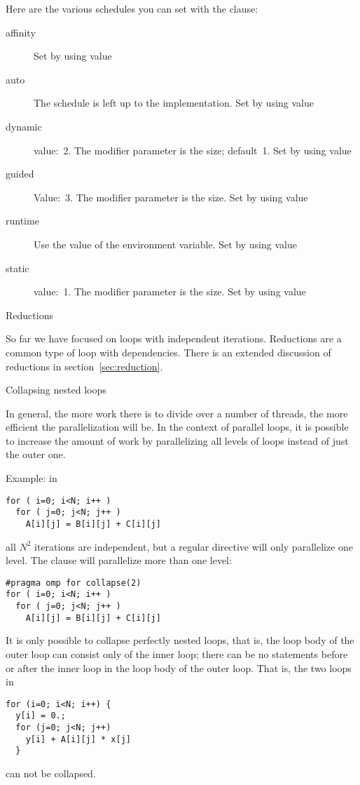 Here are the various schedules you can set with the
 clause:
\begin{description}
  \item[affinity] Set by using value  
  \item[auto] The schedule is left up to the implementation. Set by
    using value 
  \item[dynamic] value:~2. The modifier parameter is the
     size; default~1. Set by using value
  \item[guided] Value:~3. The modifier parameter is the
     size. Set by using value
  \item[runtime] Use the value of the 
    environment variable. Set by using value
  \item[static] value:~1. The modifier parameter is the  size. Set by using value  
\end{description}

 {Reductions}

So far we have focused on loops with independent iterations.
Reductions are a common type of loop with dependencies.
There is an extended discussion of reductions in section~\ref{sec:reduction}.

 {Collapsing nested loops}

In general, the more work there is to divide over a number of threads,
the more efficient the parallelization will be. In the context of
parallel loops, it is possible to increase the amount of work by
parallelizing all levels of loops instead of just the outer one.

Example: in
\begin{verbatim}
for ( i=0; i<N; i++ )
  for ( j=0; j<N; j++ )
    A[i][j] = B[i][j] + C[i][j] 
\end{verbatim}
all $N^2$ iterations are independent, but a regular 
directive will only parallelize one level. The 
clause will parallelize more than one level:
\begin{verbatim}
#pragma omp for collapse(2)
for ( i=0; i<N; i++ )
  for ( j=0; j<N; j++ )
    A[i][j] = B[i][j] + C[i][j] 
\end{verbatim}
It is only possible to collapse perfectly nested loops, that is, the
loop body of the outer loop can consist only of the inner loop; there
can be no statements before or after the inner loop in the loop body
of the outer loop. That is, the two loops in
\begin{verbatim}
for (i=0; i<N; i++) {
  y[i] = 0.;
  for (j=0; j<N; j++)
    y[i] + A[i][j] * x[j]
  }
\end{verbatim}
can not be collapsed.

